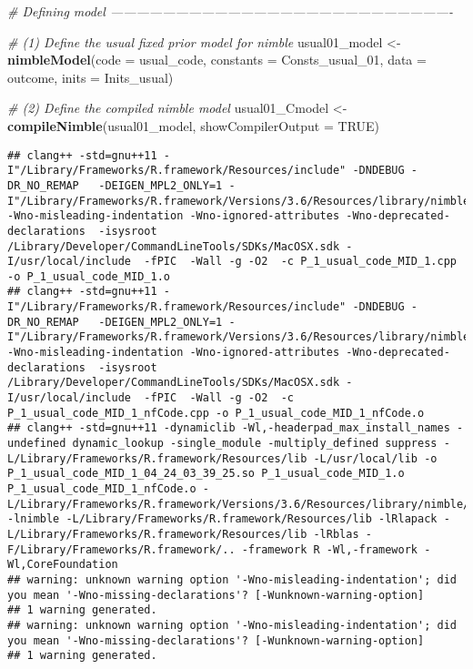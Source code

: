 \documentclass[]{article}
\newenvironment{Shaded}{\begin{snugshade}}{\end{snugshade}}
\newcommand{\CommentTok}[1]{\textcolor[rgb]{0.56,0.35,0.01}{\textit{#1}}}
\newcommand{\DataTypeTok}[1]{\textcolor[rgb]{0.13,0.29,0.53}{#1}}
\newcommand{\DecValTok}[1]{\textcolor[rgb]{0.00,0.00,0.81}{#1}}
\newcommand{\KeywordTok}[1]{\textcolor[rgb]{0.13,0.29,0.53}{\textbf{#1}}}
\newcommand{\NormalTok}[1]{#1}
\newcommand{\OtherTok}[1]{\textcolor[rgb]{0.56,0.35,0.01}{#1}}
\newcommand{\StringTok}[1]{\textcolor[rgb]{0.31,0.60,0.02}{#1}}
\begin{document}
\begin{Shaded}
\begin{Highlighting}[]
\CommentTok{# Defining model -------------------------------------------------------------------------------}

\CommentTok{# (1) Define the usual fixed prior model for nimble}
\NormalTok{usual01_model <-}\StringTok{ }\KeywordTok{nimbleModel}\NormalTok{(}\DataTypeTok{code =}\NormalTok{ usual_code, }\DataTypeTok{constants =}\NormalTok{ Consts_usual_}\DecValTok{01}\NormalTok{, }\DataTypeTok{data =}\NormalTok{ outcome, }\DataTypeTok{inits =}\NormalTok{ Inits_usual)}

\CommentTok{# (2) Define the compiled nimble model}
\NormalTok{usual01_Cmodel <-}\StringTok{ }\KeywordTok{compileNimble}\NormalTok{(usual01_model, }\DataTypeTok{showCompilerOutput =} \OtherTok{TRUE}\NormalTok{)      }
\end{Highlighting}
\end{Shaded}

\begin{verbatim}
## clang++ -std=gnu++11 -I"/Library/Frameworks/R.framework/Resources/include" -DNDEBUG -DR_NO_REMAP   -DEIGEN_MPL2_ONLY=1 -I"/Library/Frameworks/R.framework/Versions/3.6/Resources/library/nimble/include" -Wno-misleading-indentation -Wno-ignored-attributes -Wno-deprecated-declarations  -isysroot /Library/Developer/CommandLineTools/SDKs/MacOSX.sdk -I/usr/local/include  -fPIC  -Wall -g -O2  -c P_1_usual_code_MID_1.cpp -o P_1_usual_code_MID_1.o
## clang++ -std=gnu++11 -I"/Library/Frameworks/R.framework/Resources/include" -DNDEBUG -DR_NO_REMAP   -DEIGEN_MPL2_ONLY=1 -I"/Library/Frameworks/R.framework/Versions/3.6/Resources/library/nimble/include" -Wno-misleading-indentation -Wno-ignored-attributes -Wno-deprecated-declarations  -isysroot /Library/Developer/CommandLineTools/SDKs/MacOSX.sdk -I/usr/local/include  -fPIC  -Wall -g -O2  -c P_1_usual_code_MID_1_nfCode.cpp -o P_1_usual_code_MID_1_nfCode.o
## clang++ -std=gnu++11 -dynamiclib -Wl,-headerpad_max_install_names -undefined dynamic_lookup -single_module -multiply_defined suppress -L/Library/Frameworks/R.framework/Resources/lib -L/usr/local/lib -o P_1_usual_code_MID_1_04_24_03_39_25.so P_1_usual_code_MID_1.o P_1_usual_code_MID_1_nfCode.o -L/Library/Frameworks/R.framework/Versions/3.6/Resources/library/nimble/CppCode -lnimble -L/Library/Frameworks/R.framework/Resources/lib -lRlapack -L/Library/Frameworks/R.framework/Resources/lib -lRblas -F/Library/Frameworks/R.framework/.. -framework R -Wl,-framework -Wl,CoreFoundation
## warning: unknown warning option '-Wno-misleading-indentation'; did you mean '-Wno-missing-declarations'? [-Wunknown-warning-option]
## 1 warning generated.
## warning: unknown warning option '-Wno-misleading-indentation'; did you mean '-Wno-missing-declarations'? [-Wunknown-warning-option]
## 1 warning generated.
\end{verbatim}
\end{document}
